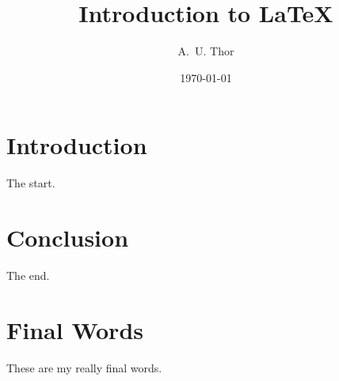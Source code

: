 \documentclass[letter,11pt]{article}
\author{A.~U. Thor}
\title{Introduction to \LaTeX}
\date{\today}
\begin{document}
  \maketitle
  \section{Introduction}
     The start.
  \section{Conclusion}
     The end. 
  \section{Final Words}
  These are my really final words.
\end{document}
